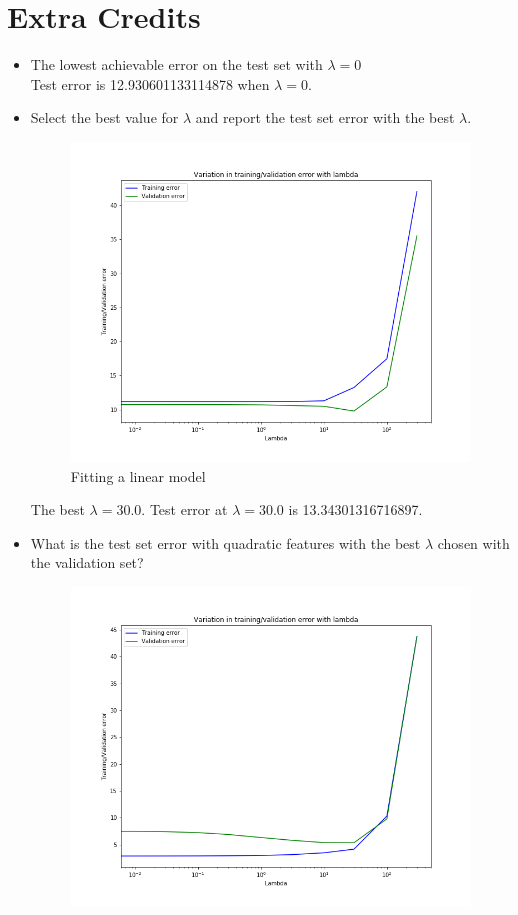 \documentclass{article}
\begin{document}
\section{Extra Credits}
\begin{itemize}
    \item The lowest achievable error on the test set with $\lambda = 0$\\
    Test error is 12.930601133114878 when $\lambda = 0$.
    \item Select the best value for $\lambda$ and report the test set error with the best $\lambda$.\\
    \begin{figure}[htbp]
	\centering
	\includegraphics[scale = 0.4]{ex_select_lambda.png}
	\caption{Fitting a linear model}
\end{figure}
The best $\lambda = 30.0$. Test error at $\lambda = 30.0$ is 13.34301316716897.
\item What is the test set error with quadratic features with the best $\lambda$ chosen with the validation set?\\
\begin{figure}[htbp]
	\centering
	\includegraphics[scale = 0.4]{ex_select_lambda_poly.png}

\end{figure}
\end{itemize}
\end{document}
